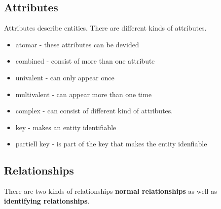 \subsection{Attributes}
Attributes describe entities. There are different kinds of attributes.
\begin{itemize}
\setlength{\itemsep}{1pt}
	\item atomar - these attributes can be devided
	\item combined - consist of more than one attribute
	\item univalent - can only appear once
	\item multivalent - can appear more than one time
	\item complex - can consist of different kind of attributes.
	\item key - makes an entity identifiable
	\item partiell key - is part of the key that makes the entity idenfiable
\end{itemize}

\subsection{Relationships}
There are two kinds of relationships \textbf{normal relationships} as well as
\textbf{identifying relationships}.
